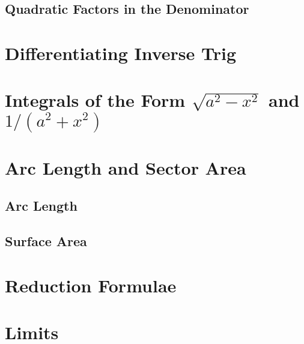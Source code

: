 \documentclass[../alevelmaths.tex]{subfiles}
\begin{document}
\subsection*{Quadratic Factors in the Denominator}
\section{Differentiating Inverse Trig}
\section{Integrals of the Form \texorpdfstring{$\sqrt{a^2-x^2}$}{sqrt(a squared -x squared)} and \texorpdfstring{$1/(a^2+x^2)$}{1/(a squared+x squared)}}
\section{Arc Length and Sector Area}
\subsection*{Arc Length}
\subsection*{Surface Area}
\section{Reduction Formulae}
\section{Limits}
\end{document}
